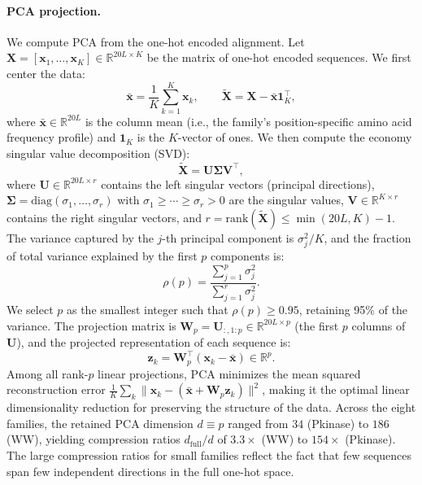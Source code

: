 \paragraph{PCA projection.}
We compute PCA from the one-hot encoded alignment. Let $\mathbf{X} = [\mathbf{x}_1, \ldots, \mathbf{x}_K] \in \mathbb{R}^{20L \times K}$ be the matrix of one-hot encoded sequences. We first center the data:
\begin{equation}
    \bar{\mathbf{x}} = \frac{1}{K}\sum_{k=1}^K \mathbf{x}_k, \qquad \tilde{\mathbf{X}} = \mathbf{X} - \bar{\mathbf{x}}\mathbf{1}_K^\top,
\end{equation}
where $\bar{\mathbf{x}} \in \mathbb{R}^{20L}$ is the column mean (i.e., the family's position-specific amino acid frequency profile) and $\mathbf{1}_K$ is the $K$-vector of ones. We then compute the economy singular value decomposition (SVD):
\begin{equation}
    \tilde{\mathbf{X}} = \mathbf{U}\boldsymbol{\Sigma}\mathbf{V}^\top,
\end{equation}
where $\mathbf{U} \in \mathbb{R}^{20L \times r}$ contains the left singular vectors (principal directions), $\boldsymbol{\Sigma} = \mathrm{diag}(\sigma_1, \ldots, \sigma_r)$ with $\sigma_1 \geq \cdots \geq \sigma_r > 0$ are the singular values, $\mathbf{V} \in \mathbb{R}^{K \times r}$ contains the right singular vectors, and $r = \mathrm{rank}(\tilde{\mathbf{X}}) \leq \min(20L, K) - 1$. The variance captured by the $j$-th principal component is $\sigma_j^2/K$, and the fraction of total variance explained by the first $p$ components is:
\begin{equation}
    \rho(p) = \frac{\sum_{j=1}^p \sigma_j^2}{\sum_{j=1}^r \sigma_j^2}.
\end{equation}
We select $p$ as the smallest integer such that $\rho(p) \geq 0.95$, retaining 95\% of the variance. The projection matrix is $\mathbf{W}_p = \mathbf{U}_{:,1:p} \in \mathbb{R}^{20L \times p}$ (the first $p$ columns of $\mathbf{U}$), and the projected representation of each sequence is:
\begin{equation}
    \mathbf{z}_k = \mathbf{W}_p^\top(\mathbf{x}_k - \bar{\mathbf{x}}) \in \mathbb{R}^p.
\end{equation}
Among all rank-$p$ linear projections, PCA minimizes the mean squared reconstruction error $\frac{1}{K}\sum_k \|\mathbf{x}_k - (\bar{\mathbf{x}} + \mathbf{W}_p\mathbf{z}_k)\|^2$, making it the optimal linear dimensionality reduction for preserving the structure of the data. Across the eight families, the retained PCA dimension $d \equiv p$ ranged from $34$ (Pkinase) to $186$ (WW), yielding compression ratios $d_{\mathrm{full}}/d$ of $3.3\times$ (WW) to $154\times$ (Pkinase). The large compression ratios for small families reflect the fact that few sequences span few independent directions in the full one-hot space.

